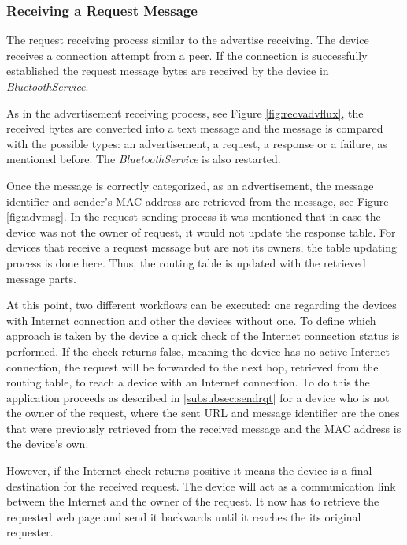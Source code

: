 \subsubsection{Receiving a Request Message}
\label{subsubsec:rcvrqt}

The request receiving process similar to the advertise receiving. The device receives a connection attempt from a peer. If the connection is successfully established the request message bytes are received by the device in \textit{BluetoothService}.

As in the advertisement receiving process, see Figure \ref{fig:recvadvflux}, the received bytes are converted into a text message and the message is compared with the possible types: an advertisement, a request, a response or a failure, as mentioned before. The \textit{BluetoothService} is also restarted.

Once the message is correctly categorized, as an advertisement, the message identifier and sender's \gls{MAC} address are retrieved from the message, see Figure \ref{fig:advmsg}. In the request sending process it was mentioned that in case the device was not the owner of request, it would not update the response table. For devices that receive a request message but are not its owners, the table updating process is done here. Thus, the routing table is updated with the retrieved message parts.

At this point, two different workflows can be executed: one regarding the devices with Internet connection and other the devices without one. To define which approach is taken by the device a quick check of the Internet connection status is performed. If the check returns false, meaning the device has no active Internet connection, the request will be forwarded to the next hop, retrieved from the routing table, to reach a device with an Internet connection. To do this the application proceeds as described in \ref{subsubsec:sendrqt} for a device who is not the owner of the request, where the sent \gls{URL} and message identifier are the ones that were previously retrieved from the received message and the \gls{MAC} address is the device's own.

However, if the Internet check returns positive it means the device is a final destination for the received request. The device will act as a communication link between the Internet and the owner of the request. It now has to retrieve the requested web page and send it backwards until it reaches the its original requester.

